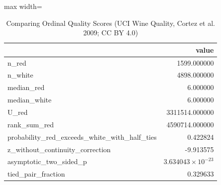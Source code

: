 \begin{table}[htbp]
\centering
\caption{Comparing Ordinal Quality Scores (UCI Wine Quality, Cortez et al. 2009; CC BY 4.0)}
\begingroup
\small
\setlength{\tabcolsep}{6pt}
\renewcommand{\arraystretch}{1.12}
\begin{adjustbox}{max width=\linewidth}
\begin{tabular}{@{}lr@{}}
\toprule
 & value \\
\midrule
n\_red & 1599.000000 \\
n\_white & 4898.000000 \\
median\_red & 6.000000 \\
median\_white & 6.000000 \\
U\_red & 3311514.000000 \\
rank\_sum\_red & 4590714.000000 \\
probability\_red\_exceeds\_white\_with\_half\_ties & 0.422824 \\
z\_without\_continuity\_correction & -9.913575 \\
asymptotic\_two\_sided\_p & $3.634043 \times 10^{-23}$ \\
tied\_pair\_fraction & 0.329633 \\
\bottomrule
\end{tabular}
\end{adjustbox}
\endgroup
\end{table}